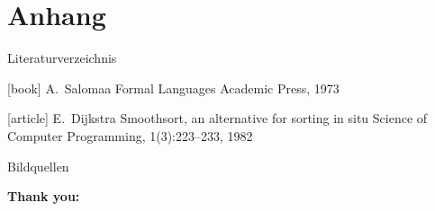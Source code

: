 \section{Anhang}
\begin{frame}{Literaturverzeichnis}
    \begin{thebibliography}{Längste Bezeichnung}
        [book]
            A.~Salomaa
            \newblock Formal Languages
            \newblock Academic Press, 1973

        [article]
            E.~Dijkstra
            \newblock Smoothsort, an alternative for sorting in situ
            \newblock Science of Computer Programming, 1(3):223--233, 1982
    \end{thebibliography}
\end{frame}

{
    \tiny
    \begin{frame}[allowframebreaks]{Bildquellen}

        \begin{minipage}{\textwidth}
            \textbf{Thank you:} \\
        \end{minipage}
    \end{frame}
}
